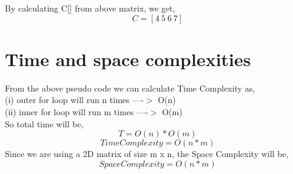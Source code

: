 \documentclass{article}
\begin{document}
By calculating C[] from above matrix, we get,
  \begin{equation*}
 	 C=[4\ 5\ 6\ 7]
  \end{equation*}
   
   
  \section{Time and space complexities}
  
  From the above pseudo code we can calculate Time Complexity as,\\
  	(i) outer for loop will run n times ----$>$ O(n)\\
  	(ii) inner for loop will run m times ----$>$ O(m)\\
  So total time will be,
  \begin{equation*}
 	 T=O(n)*O(m)	 
  \end{equation*}
  \begin{equation*}
 	 Time Complexity=O(n*m)	 
  \end{equation*}
Since we are using a 2D matrix of size m x n, the Space Complexity will be,\\
  \begin{equation*}
 	 Space Complexity=O(n*m)	 
  \end{equation*}
   
\end{document}
